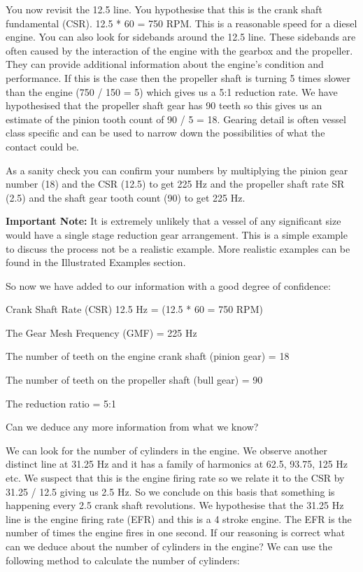 You now revisit the 12.5 line. You hypothesise that this is the crank shaft fundamental (CSR). 12.5 * 60 = 750 RPM. This is a reasonable speed for a diesel engine. You can also look for sidebands around the 12.5 line. These sidebands are often caused by the interaction of the engine with the gearbox and the propeller. They can provide additional information about the engine's condition and performance. If this is the case then the propeller shaft is turning 5 times slower than the engine (750 / 150 = 5) which gives us a 5:1 reduction rate. We have hypothesised that the propeller shaft gear has 90 teeth so this gives us an estimate of the pinion tooth count of 90 / 5 = 18. Gearing detail is often vessel class specific and can be used to narrow down the possibilities of what the contact could be.

As a sanity check you can confirm your numbers by multiplying the pinion gear number (18) and the CSR (12.5) to get 225 Hz and the propeller shaft rate SR (2.5) and the shaft gear tooth count (90) to get 225 Hz.

\begin{faintquote}
    \textbf{Important Note:} It is extremely unlikely that a vessel of any significant size would have a single stage reduction gear arrangement. This is a simple example to discuss the process not be a realistic example. More realistic examples can be found in the Illustrated Examples section.
\end{faintquote}

So now we have added to our information with a good degree of confidence:

\begin{compactitem}
    \item Crank Shaft Rate (CSR) 12.5 Hz = (12.5 * 60 = 750 RPM)
    \item The Gear Mesh Frequency (GMF) = 225 Hz 
    \item The number of teeth on the engine crank shaft (pinion gear) = 18
    \item The number of teeth on the propeller shaft (bull gear) = 90
    \item The reduction ratio = 5:1
\end{compactitem}

Can we deduce any more information from what we know?

We can look for the number of cylinders in the engine. We observe another distinct line at 31.25 Hz and it has a family of harmonics at 62.5, 93.75, 125 Hz etc. We suspect that this is the engine firing rate so we relate it to the CSR by 31.25 / 12.5 giving us 2.5 Hz. So we conclude on this basis that something is happening every 2.5 crank shaft revolutions. We hypothesise that the 31.25 Hz line is the engine firing rate (EFR) and this is a 4 stroke engine. The EFR is the number of times the engine fires in one second. If our reasoning is correct what can we deduce about the number of cylinders in the engine? We can use the following method to calculate the number of cylinders:


